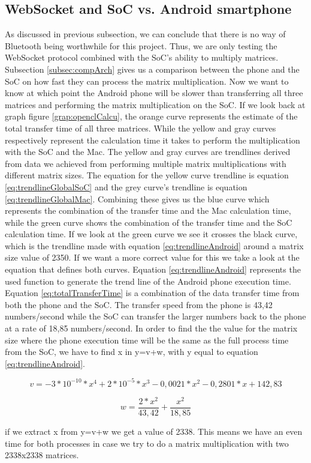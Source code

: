 \documentclass[a4paper, 11pt]{report}
\begin{document}
\subsection{WebSocket and SoC vs. Android smartphone}
As discussed in previous subsection, we can conclude that there is no way of Bluetooth being worthwhile for this project. Thus, we are only testing the WebSocket protocol combined with the SoC's ability to multiply matrices. Subsection \ref{subsec:compArch} gives us a comparison between the phone and the SoC on how fast they can process the matrix multiplication. Now we want to know at which point the Android phone will be slower than transferring all three matrices and performing the matrix multiplication on the SoC. If we look back at graph figure \ref{grap:openclCalcu}, the orange curve represents the estimate of the total transfer time of all three matrices. While the yellow and gray curves respectively represent the calculation time it takes to perform the multiplication with the SoC and the Mac. The yellow and gray curves are trendlines derived from data we achieved from performing multiple matrix multiplications with different matrix sizes. The equation for the yellow curve trendline is equation \ref{eq:trendlineGlobalSoC} and the grey curve's trendline is equation \ref{eq:trendlineGlobalMac}. Combining these gives us the blue curve which represents the combination of the transfer time and the Mac calculation time, while the green curve shows the combination of the transfer time and the SoC calculation time. If we look at the green curve we see it crosses the black curve, which is the trendline made with equation \ref{eq:trendlineAndroid} around a matrix size value of 2350. If we want a more correct value for this we take a look at the equation that defines both curves. Equation \ref{eq:trendlineAndroid} represents the used function to generate the trend line of the Android phone execution time. Equation \ref{eq:totalTransferTime} is a combination of the data transfer time from both the phone and the SoC. The transfer speed from the phone is 43,42 numbers/second while the SoC can transfer the larger numbers back to the phone at a rate of 18,85 numbers/second. In order to find the the value for the matrix size where the phone execution time will be the same as the full process time from the SoC, we have to find x in y=v+w, with y equal to equation \ref{eq:trendlineAndroid}.

\begin{equation} \label{eq:totalCalcTimeSoC}
v = -3*10^{-10}*x^4+2*10^{-5}*x^3-0,0021*x^2-0,2801*x+142,83
\end{equation}

\begin{equation} \label{eq:totalTransferTime}
w = \frac{2*x^2}{43,42}+\frac{x^2}{18,85}
\end{equation}

if we extract x from y=v+w we get a value of 2338. This means we have an even time for both processes in case we try to do a matrix multiplication with two 2338x2338 matrices.






\end{document}

